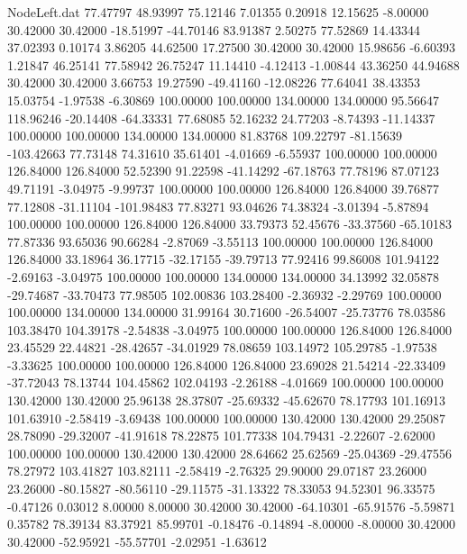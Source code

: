 \begin{filecontents}{NodeLeft.dat}
  77.47797   48.93997   75.12146     7.01355    0.20918   12.15625   -8.00000   30.42000   30.42000  -18.51997  -44.70146   83.91387    2.50275
  77.52869   14.43344   37.02393     0.10174    3.86205   44.62500   17.27500   30.42000   30.42000   15.98656   -6.60393    1.21847   46.25141
  77.58942   26.75247   11.14410    -4.12413   -1.00844   43.36250   44.94688   30.42000   30.42000    3.66753   19.27590  -49.41160  -12.08226
  77.64041   38.43353   15.03754    -1.97538   -6.30869  100.00000  100.00000  134.00000  134.00000   95.56647  118.96246  -20.14408  -64.33331
  77.68085   52.16232   24.77203    -8.74393  -11.14337  100.00000  100.00000  134.00000  134.00000   81.83768  109.22797  -81.15639 -103.42663
  77.73148   74.31610   35.61401    -4.01669   -6.55937  100.00000  100.00000  126.84000  126.84000   52.52390   91.22598  -41.14292  -67.18763
  77.78196   87.07123   49.71191    -3.04975   -9.99737  100.00000  100.00000  126.84000  126.84000   39.76877   77.12808  -31.11104 -101.98483
  77.83271   93.04626   74.38324    -3.01394   -5.87894  100.00000  100.00000  126.84000  126.84000   33.79373   52.45676  -33.37560  -65.10183
  77.87336   93.65036   90.66284    -2.87069   -3.55113  100.00000  100.00000  126.84000  126.84000   33.18964   36.17715  -32.17155  -39.79713
  77.92416   99.86008  101.94122    -2.69163   -3.04975  100.00000  100.00000  134.00000  134.00000   34.13992   32.05878  -29.74687  -33.70473
  77.98505  102.00836  103.28400    -2.36932   -2.29769  100.00000  100.00000  134.00000  134.00000   31.99164   30.71600  -26.54007  -25.73776
  78.03586  103.38470  104.39178    -2.54838   -3.04975  100.00000  100.00000  126.84000  126.84000   23.45529   22.44821  -28.42657  -34.01929
  78.08659  103.14972  105.29785    -1.97538   -3.33625  100.00000  100.00000  126.84000  126.84000   23.69028   21.54214  -22.33409  -37.72043
  78.13744  104.45862  102.04193    -2.26188   -4.01669  100.00000  100.00000  130.42000  130.42000   25.96138   28.37807  -25.69332  -45.62670
  78.17793  101.16913  101.63910    -2.58419   -3.69438  100.00000  100.00000  130.42000  130.42000   29.25087   28.78090  -29.32007  -41.91618
  78.22875  101.77338  104.79431    -2.22607   -2.62000  100.00000  100.00000  130.42000  130.42000   28.64662   25.62569  -25.04369  -29.47556
  78.27972  103.41827  103.82111    -2.58419   -2.76325   29.90000   29.07187   23.26000   23.26000  -80.15827  -80.56110  -29.11575  -31.13322
  78.33053   94.52301   96.33575    -0.47126    0.03012    8.00000    8.00000   30.42000   30.42000  -64.10301  -65.91576   -5.59871    0.35782
  78.39134   83.37921   85.99701    -0.18476   -0.14894   -8.00000   -8.00000   30.42000   30.42000  -52.95921  -55.57701   -2.02951   -1.63612

\end{filecontents}
